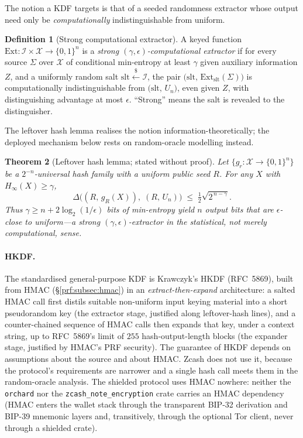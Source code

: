 \documentclass[11pt,a4paper]{article}
\newtheorem{theorem}{Theorem}[section]
\theoremstyle{definition}
\newtheorem{definition}[theorem]{Definition}
\theoremstyle{remark}
\begin{document}
The notion a KDF targets is that of a seeded randomness extractor
whose output need only be \emph{computationally} indistinguishable
from uniform.

\begin{definition}[Strong computational extractor]
\label{symmetric:def-extractor}
A keyed function
\(\mathrm{Ext} : \mathcal{I} \times \mathcal{X} \to \{0,1\}^{n}\) is
a \emph{strong \((\gamma, \epsilon)\)-computational extractor} if for
every source \(\Sigma\) over \(\mathcal{X}\) of conditional
min-entropy at least \(\gamma\) given auxiliary information \(Z\),
and a uniformly random salt
\(\mathrm{slt} \xleftarrow{\$} \mathcal{I}\), the pair
\(\bigl(\mathrm{slt},\, \mathrm{Ext}_{\mathrm{slt}}(\Sigma)\bigr)\)
is computationally indistinguishable from
\(\bigl(\mathrm{slt},\, U_{n}\bigr)\), even given \(Z\), with
distinguishing advantage at most \(\epsilon\). ``Strong'' means the
salt is revealed to the distinguisher.
\end{definition}

The leftover hash lemma realises the notion information-theoretically;
the deployed mechanism below rests on random-oracle modelling instead.

\begin{theorem}[Leftover hash lemma; stated without proof]
\label{symmetric:thm-lhl}
Let \(\{g_{r} : \mathcal{X} \to \{0,1\}^{n}\}\) be a
\(2^{-n}\)-universal hash family with a uniform public seed \(R\).
For any \(X\) with \(H_{\infty}(X) \ge \gamma\),
\[
\Delta\bigl( (R,\, g_{R}(X)),\; (R,\, U_{n}) \bigr)
\;\le\; \tfrac12 \sqrt{2^{\,n - \gamma}}.
\]
Thus \(\gamma \ge n + 2 \log_{2}(1/\epsilon)\) bits of min-entropy
yield \(n\) output bits that are \(\epsilon\)-close to uniform---a
strong \((\gamma, \epsilon)\)-extractor in the statistical, not
merely computational, sense.
\end{theorem}

\paragraph{HKDF.}
The standardised general-purpose KDF is Krawczyk's \textsf{HKDF}
(RFC~5869), built from HMAC (\S\ref{prf:subsec:hmac}) in an
\emph{extract-then-expand} architecture: a salted HMAC call first
distils suitable non-uniform input keying material into a short
pseudorandom key (the extractor stage, justified along leftover-hash
lines), and a counter-chained sequence of HMAC calls then expands
that key, under a context string, up to RFC~5869's limit of \(255\)
hash-output-length blocks (the expander stage, justified by HMAC's
PRF security). The guarantee of \textsf{HKDF} depends on assumptions
about the source and about HMAC. Zcash does not use it, because the
protocol's requirements are narrower and a single hash call meets them
in the random-oracle analysis. The
shielded protocol uses HMAC nowhere: neither the \texttt{orchard} nor
the \texttt{zcash\_note\_encryption} crate carries an HMAC dependency
(HMAC enters the wallet stack through the transparent BIP-32
derivation and BIP-39 mnemonic layers and, transitively, through the
optional Tor client, never through a shielded crate).
\end{document}
